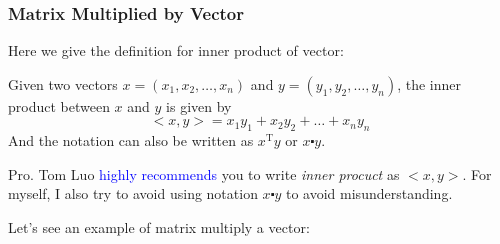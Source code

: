 \subsubsection{Matrix Multiplied by Vector}
Here we give the definition for inner product of vector:
\begin{definition}
Given two vectors $x = (x_1,x_2,\dots,x_n)$ and $y = (y_1,y_2,\dots,y_n)$, the inner product between $x$ and $y$ is given by 
\begin{equation*}
<x,y> = x_1y_1 + x_2y_2 + \dots + x_ny_n
\end{equation*}
And the notation can also be written as $x^{\mathrm{T}}y$ or $x \centerdot y$.
\end{definition}
\begin{remark}
Pro. Tom Luo \textcolor{blue}{highly recommends} you to write \textit{inner procuct} as $
<x,y>$. For myself, I also try to avoid using notation $x \centerdot y$ to avoid misunderstanding.
\end{remark}
Let's see an example of matrix multiply a vector:
